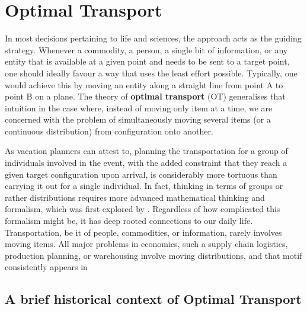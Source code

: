 \newcommand{\mcX}{\mathcal{X}}
\newcommand{\bfitr}{\symbfit{r}}
\newcommand{\bfitc}{\symbfit{c}}

\chapter{Optimal Transport}\label{chap:optimal-transport}

In most decisions pertaining to life and sciences, the  approach acts as the guiding strategy. Whenever a commodity, a person, a single bit of information, or any entity that is available at a given point and needs to be sent to a target point, one should ideally favour a way that uses the least effort possible. Typically, one would achieve this by moving an entity along a straight line from point A to point B on a plane.
The theory of \textbf{optimal transport} (OT) generalises that intuition in the case where, instead of moving only item at a time, we are concerned with the problem of simultaneously moving several items (or a continuous distribution) from configuration onto another.

As vacation planners can attest to, planning the transportation for a group of individuals involved in the event, with the added constraint that they reach a given target configuration upon arrival, is considerably more tortuous than carrying it out for a single individual. In fact, thinking in terms of groups or rather distributions requires more advanced mathematical thinking and formalism, which was first explored by \textcite{monge1781memoire}. Regardless of how complicated this formalism might be, it has deep rooted connections to our daily life. 
Transportation, be it of people, commodities, or information, rarely involves moving items. All major problems in economics, such a supply chain logistics, production planning, or warehousing involve moving distributions, and that motif consistently appears in  

\section{A brief historical context of Optimal Transport}\label{sec:ot-history}

